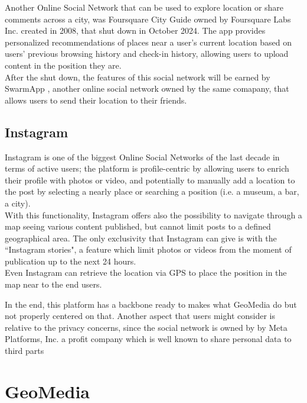 \documentclass[conference]{IEEEtran}
\begin{document}
Another Online Social Network that can be used to explore location or share comments across a city, was Foursquare City Guide\cite{FourSquareWiki} owned by Foursquare Labs Inc. \cite{FoursquareOfficialLink} created in 2008, that shut down in October 2024.
The app provides personalized recommendations of places near a user's current location based on users' previous browsing history and check-in history, allowing users to upload content in the position they are.
\\
After the shut down, the features of this social network will be earned by SwarmApp \cite{FoursquareSwarm}, another online social network owned by the same comapany, that allows users to send their location to their friends.


\subsection{Instagram}
Instagram \cite{Instagram} is one of the biggest Online Social Networks of the last decade in terms of active users; the platform is profile-centric by allowing users to enrich their profile with photos or video, and potentially to manually add a location to the post by selecting a nearly place or searching a position (i.e. a museum, a bar, a city).
\\
With this functionality, Instagram offers also the possibility to navigate through a map seeing various content published, but cannot limit posts to a defined geographical area.
The only exclusivity that Instagram can give is with the ``Instagram stories", a feature which limit photos or videos from the moment of publication up to the next 24 hours.
\\
Even Instagram can retrieve the location via GPS to place the position in the map near to the end users.

In the end, this platform has a backbone ready to makes what GeoMedia do but not properly centered on that. Another aspect that users might consider is relative to the privacy concerns, since the social network is owned by by Meta Platforms, Inc. a profit company which is well known to share personal data to third parts\cite{MetaPrivacy}



\section{GeoMedia}
\end{document}
